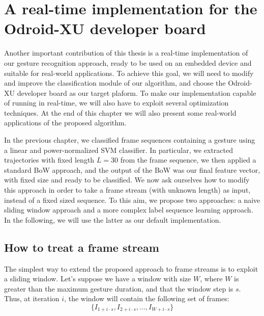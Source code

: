 
\chapter{A real-time implementation for the Odroid-XU developer board}


Another important contribution of this thesis is a real-time implementation of our gesture recognition approach, ready to be used on an embedded device and suitable for real-world applications. To achieve this goal, we will need to modify and improve the classification module of our algorithm, and choose the Odroid-XU developer board as our target plaform. To make our implementation capable of running in real-time, we will also have to exploit several optimization techniques. At the end of this chapter we will also present some real-world applications of the proposed algorithm.

In the previous chapter, we classified frame sequences containing a gesture using a linear and power-normalized SVM classifier. In particular, we extracted trajectories with fixed length $L=30$ from the frame sequence, we then applied a standard BoW approach, and the output of the BoW was our final feature vector, with fixed size and ready to be classified. We now ask ourselves how to modify this approach in order to take a frame stream (with unknown length) as input, instead of a fixed sized sequence. To this aim, we propose two approaches: a naive sliding window approach and a more complex label sequence learning approach. In the following, we will use the latter as our default implementation.

\section{How to treat a frame stream}
The simplest way to extend the proposed approach to frame streams is to exploit a sliding window. Let's suppose we have a window with size $W$, where $W$ is greater than the maximum gesture duration, and that the window step is $s$. Thus, at iteration $i$, the window will contain the following set of frames:
\begin{equation}
\{ I_{1+i\cdot s}, I_{2+i \cdot s}, ..., I_{W+i \cdot s} \}
\end{equation}

